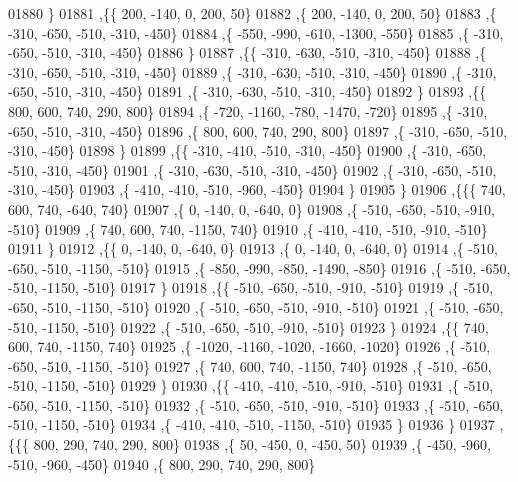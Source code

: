 \begin{DoxyCode}
01880     \}
01881    ,\{\{   200,  -140,     0,   200,    50\}
01882     ,\{   200,  -140,     0,   200,    50\}
01883     ,\{  -310,  -650,  -510,  -310,  -450\}
01884     ,\{  -550,  -990,  -610, -1300,  -550\}
01885     ,\{  -310,  -650,  -510,  -310,  -450\}
01886     \}
01887    ,\{\{  -310,  -630,  -510,  -310,  -450\}
01888     ,\{  -310,  -650,  -510,  -310,  -450\}
01889     ,\{  -310,  -630,  -510,  -310,  -450\}
01890     ,\{  -310,  -650,  -510,  -310,  -450\}
01891     ,\{  -310,  -630,  -510,  -310,  -450\}
01892     \}
01893    ,\{\{   800,   600,   740,   290,   800\}
01894     ,\{  -720, -1160,  -780, -1470,  -720\}
01895     ,\{  -310,  -650,  -510,  -310,  -450\}
01896     ,\{   800,   600,   740,   290,   800\}
01897     ,\{  -310,  -650,  -510,  -310,  -450\}
01898     \}
01899    ,\{\{  -310,  -410,  -510,  -310,  -450\}
01900     ,\{  -310,  -650,  -510,  -310,  -450\}
01901     ,\{  -310,  -630,  -510,  -310,  -450\}
01902     ,\{  -310,  -650,  -510,  -310,  -450\}
01903     ,\{  -410,  -410,  -510,  -960,  -450\}
01904     \}
01905    \}
01906   ,\{\{\{   740,   600,   740,  -640,   740\}
01907     ,\{     0,  -140,     0,  -640,     0\}
01908     ,\{  -510,  -650,  -510,  -910,  -510\}
01909     ,\{   740,   600,   740, -1150,   740\}
01910     ,\{  -410,  -410,  -510,  -910,  -510\}
01911     \}
01912    ,\{\{     0,  -140,     0,  -640,     0\}
01913     ,\{     0,  -140,     0,  -640,     0\}
01914     ,\{  -510,  -650,  -510, -1150,  -510\}
01915     ,\{  -850,  -990,  -850, -1490,  -850\}
01916     ,\{  -510,  -650,  -510, -1150,  -510\}
01917     \}
01918    ,\{\{  -510,  -650,  -510,  -910,  -510\}
01919     ,\{  -510,  -650,  -510, -1150,  -510\}
01920     ,\{  -510,  -650,  -510,  -910,  -510\}
01921     ,\{  -510,  -650,  -510, -1150,  -510\}
01922     ,\{  -510,  -650,  -510,  -910,  -510\}
01923     \}
01924    ,\{\{   740,   600,   740, -1150,   740\}
01925     ,\{ -1020, -1160, -1020, -1660, -1020\}
01926     ,\{  -510,  -650,  -510, -1150,  -510\}
01927     ,\{   740,   600,   740, -1150,   740\}
01928     ,\{  -510,  -650,  -510, -1150,  -510\}
01929     \}
01930    ,\{\{  -410,  -410,  -510,  -910,  -510\}
01931     ,\{  -510,  -650,  -510, -1150,  -510\}
01932     ,\{  -510,  -650,  -510,  -910,  -510\}
01933     ,\{  -510,  -650,  -510, -1150,  -510\}
01934     ,\{  -410,  -410,  -510, -1150,  -510\}
01935     \}
01936    \}
01937   ,\{\{\{   800,   290,   740,   290,   800\}
01938     ,\{    50,  -450,     0,  -450,    50\}
01939     ,\{  -450,  -960,  -510,  -960,  -450\}
01940     ,\{   800,   290,   740,   290,   800\}

\end{DoxyCode}
